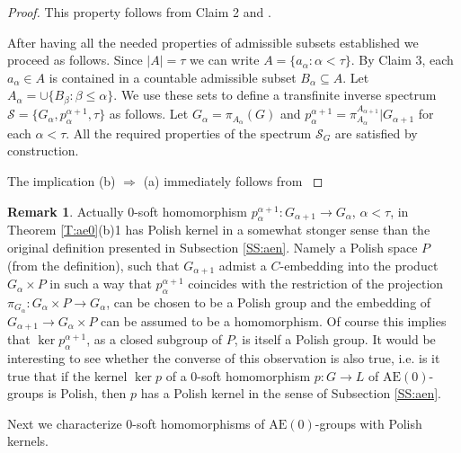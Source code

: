 \documentclass[12pt,draft]{amsart}
\theoremstyle{plain}
\theoremstyle{definition}
\newtheorem{rem}[thm]{Remark}
\numberwithin{equation}{section}
\begin{document}
\begin{proof}
This property follows from Claim 2 and \cite[Lemma 6.1.15]{chibook96}.

After having all the needed properties of admissible subsets
established we proceed as follows. Since $|A| = \tau$ we can
write $A = \{ a_{\alpha} \colon \alpha < \tau\}$. By Claim 3,
each $a_{\alpha} \in A$ is contained in a countable admissible
subset $B_{\alpha} \subseteq A$. Let
$A_{\alpha} = \cup\{ B_{\beta} \colon \beta \leq \alpha\}$.
We use these sets to define a transfinite inverse spectrum
${\mathcal S} = \{ G_{\alpha}, p_{\alpha}^{\alpha +1}, \tau \}$
as follows. Let $G_{\alpha} = \pi_{A_{\alpha}}(G)$ and
$p_{\alpha}^{\alpha +1} = \pi_{A_{\alpha}}^{A_{\alpha +1}}|
G_{\alpha +1}$ for each $\alpha < \tau$. All the required
properties of the spectrum ${\mathcal S}_{G}$ are satisfied by
construction. 

The implication (b) $\Longrightarrow$ (a) immediately
follows from \cite[Proposition 6.3.4]{chibook96}
\end{proof}

\begin{rem}
Actually $0$-soft homomorphism $p_{\alpha}^{\alpha +1} \colon
G_{\alpha+1} \to G_{\alpha}$, $\alpha < \tau$, in Theorem \ref{T:ae0}(b)1
has Polish kernel in a somewhat
 stonger sense than the original definition  presented in
Subsection \ref{SS:aen}. Namely a Polish space $P$ (from
the definition), such that $G_{\alpha +1}$ admist a
$C$-embedding into the product $G_{\alpha} \times P$ in such a way that
$p_{\alpha}^{\alpha +1}$ coincides with the restriction of
the projection
$\pi_{G_{\alpha}} \colon G_{\alpha} \times P \to G_{\alpha}$,
can be chosen to be a Polish group and the embedding of
$G_{\alpha +1} \to G_{\alpha} \times P$ can be assumed to
be a homomorphism. Of course this implies that
$\ker p_{\alpha}^{\alpha +1}$, as a closed subgroup of $P$, is
itself a Polish group. It would be interesting to see whether
the converse of this observation is also true, i.e. is it true that
if the kernel $\ker p$ of a $0$-soft homomorphism $p \colon G \to L$
of $\text{AE}(0)$-groups is Polish, then $p$ has a Polish kernel
in the sense of Subsection \ref{SS:aen}.
\end{rem}


Next we characterize $0$-soft homomorphisms of $\text{AE}(0)$-groups
with Polish kernels.
\end{document}
